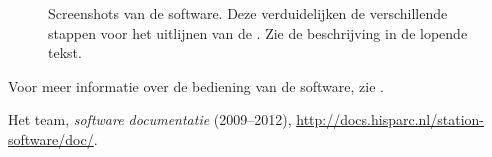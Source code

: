 \begin{figure}
\centering
{}
\hfill
{}
\hfill
{}

\vspace{1em}

\hfill
{}
\hfill
{}
\caption{Screenshots van de \daq software.  Deze verduidelijken de
verschillende stappen voor het uitlijnen van de \adcs.  Zie de
beschrijving in de lopende tekst.}
\end{figure}

Voor meer informatie over de bediening van de \daq software, zie
\cite{software-handleiding}.


\begin{thebibliography}{9}
 Het \hisparc team, \emph{\hisparc software
documentatie} (2009--2012),
\url{http://docs.hisparc.nl/station-software/doc/}.
\end{thebibliography}


